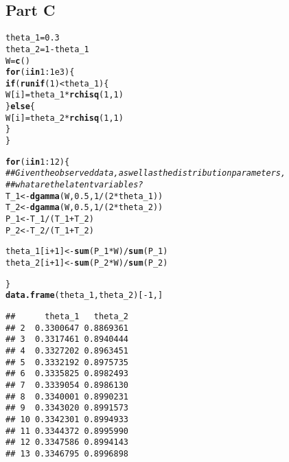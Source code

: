 \documentclass{article}\usepackage[]{graphicx}\usepackage[]{color}
\makeatletter
\newcommand{\hlnum}[1]{\textcolor[rgb]{0.686,0.059,0.569}{#1}}%
\newcommand{\hlcom}[1]{\textcolor[rgb]{0.678,0.584,0.686}{\textit{#1}}}%
\newcommand{\hlopt}[1]{\textcolor[rgb]{0,0,0}{#1}}%
\newcommand{\hlstd}[1]{\textcolor[rgb]{0.345,0.345,0.345}{#1}}%
\newcommand{\hlkwa}[1]{\textcolor[rgb]{0.161,0.373,0.58}{\textbf{#1}}}%
\newcommand{\hlkwb}[1]{\textcolor[rgb]{0.69,0.353,0.396}{#1}}%
\newcommand{\hlkwd}[1]{\textcolor[rgb]{0.737,0.353,0.396}{\textbf{#1}}}%
\newenvironment{kframe}{%
 \def\at@end@of@kframe{}%
 \ifinner\ifhmode%
  \def\at@end@of@kframe{\end{minipage}}%
  \begin{minipage}{\columnwidth}%
 \fi\fi%
 \def\FrameCommand##1{\hskip\@totalleftmargin \hskip-\fboxsep
 \colorbox{shadecolor}{##1}\hskip-\fboxsep
     \hskip-\linewidth \hskip-\@totalleftmargin \hskip\columnwidth}%
 \MakeFramed {\advance\hsize-\width
   \@totalleftmargin\z@ \linewidth\hsize
   \@setminipage}}%
 {\par\unskip\endMakeFramed%
 \at@end@of@kframe}
\newenvironment{knitrout}{}{} %
\makeatother
\begin{document}
\subsection*{Part C}
\begin{knitrout}
\color{fgcolor}\begin{kframe}
\begin{alltt}
\hlstd{theta_1} \hlkwb{=} \hlnum{0.3}
\hlstd{theta_2} \hlkwb{=} \hlnum{1}\hlopt{-}\hlstd{theta_1}
\hlstd{W} \hlkwb{=} \hlkwd{c}\hlstd{()}
\hlkwa{for}\hlstd{(i} \hlkwa{in} \hlnum{1}\hlopt{:}\hlnum{1e3}\hlstd{)\{}
  \hlkwa{if}\hlstd{(}\hlkwd{runif}\hlstd{(}\hlnum{1}\hlstd{)}\hlopt{<} \hlstd{theta_1)\{}
    \hlstd{W[i]} \hlkwb{=} \hlstd{theta_1}\hlopt{*}\hlkwd{rchisq}\hlstd{(}\hlnum{1}\hlstd{,}\hlnum{1}\hlstd{)}
  \hlstd{\}} \hlkwa{else} \hlstd{\{}
    \hlstd{W[i]} \hlkwb{=} \hlstd{theta_2}\hlopt{*}\hlkwd{rchisq}\hlstd{(}\hlnum{1}\hlstd{,}\hlnum{1}\hlstd{)}
  \hlstd{\}}
\hlstd{\}}

\hlkwa{for}\hlstd{( i} \hlkwa{in} \hlnum{1}\hlopt{:}\hlnum{12}\hlstd{) \{}
  \hlcom{## Given the observed data, as well as the distribution parameters,}
  \hlcom{## what are the latent variables?}
  \hlstd{T_1} \hlkwb{<-} \hlkwd{dgamma}\hlstd{(W,}\hlnum{0.5}\hlstd{,} \hlnum{1}\hlopt{/}\hlstd{(}\hlnum{2}\hlopt{*}\hlstd{theta_1))}
  \hlstd{T_2} \hlkwb{<-} \hlkwd{dgamma}\hlstd{(W,}\hlnum{0.5}\hlstd{,} \hlnum{1}\hlopt{/}\hlstd{(}\hlnum{2}\hlopt{*}\hlstd{theta_2))}
  \hlstd{P_1} \hlkwb{<-} \hlstd{T_1} \hlopt{/} \hlstd{(T_1} \hlopt{+} \hlstd{T_2)}
  \hlstd{P_2} \hlkwb{<-} \hlstd{T_2} \hlopt{/} \hlstd{(T_1} \hlopt{+} \hlstd{T_2)}

  \hlstd{theta_1[i}\hlopt{+}\hlnum{1}\hlstd{]} \hlkwb{<-}  \hlkwd{sum}\hlstd{( P_1} \hlopt{*} \hlstd{W)} \hlopt{/} \hlkwd{sum}\hlstd{(P_1)}
  \hlstd{theta_2[i}\hlopt{+}\hlnum{1}\hlstd{]} \hlkwb{<-} \hlkwd{sum}\hlstd{( P_2} \hlopt{*} \hlstd{W)} \hlopt{/} \hlkwd{sum}\hlstd{(P_2)}

\hlstd{\}}
\hlkwd{data.frame}\hlstd{(theta_1, theta_2)[}\hlopt{-}\hlnum{1}\hlstd{,]}
\end{alltt}
\begin{verbatim}
##      theta_1   theta_2
## 2  0.3300647 0.8869361
## 3  0.3317461 0.8940444
## 4  0.3327202 0.8963451
## 5  0.3332192 0.8975735
## 6  0.3335825 0.8982493
## 7  0.3339054 0.8986130
## 8  0.3340001 0.8990231
## 9  0.3343020 0.8991573
## 10 0.3342301 0.8994933
## 11 0.3344372 0.8995990
## 12 0.3347586 0.8994143
## 13 0.3346795 0.8996898
\end{verbatim}
\end{kframe}
\end{knitrout}
\end{document}
